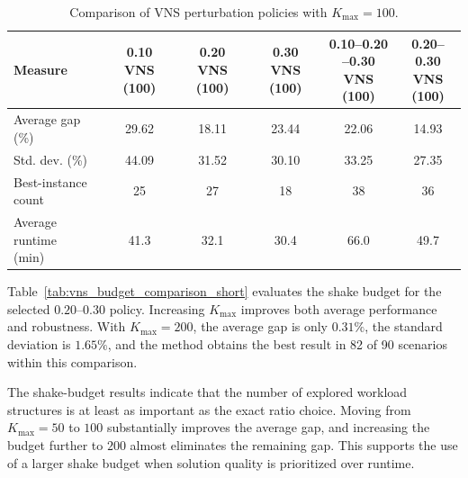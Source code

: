 \documentclass[11pt]{article}
\begin{document}
\begin{table}[H]
\centering
\caption{Comparison of VNS perturbation policies with \(K_{\max}=100\).}
\label{tab:vns_ratio_comparison_short}
\small
\begin{tabular}{lccccc}
\hline
\textbf{Measure}
&
\shortstack{\textbf{0.10}\\\textbf{VNS (100)}}
&
\shortstack{\textbf{0.20}\\\textbf{VNS (100)}}
&
\shortstack{\textbf{0.30}\\\textbf{VNS (100)}}
&
\shortstack{\textbf{0.10--0.20}\\\textbf{--0.30}\\\textbf{VNS (100)}}
&
\shortstack{\textbf{0.20--0.30}\\\textbf{VNS}\\\textbf{(100)}} \\
\hline
Average gap (\%) & 29.62 & 18.11 & 23.44 & 22.06 & 14.93 \\
Std. dev. (\%) & 44.09 & 31.52 & 30.10 & 33.25 & 27.35 \\
\shortstack[l]{Best-instance\\count} & 25 & 27 & 18 & 38 & 36 \\
\shortstack[l]{Average runtime\\(min)} & 41.3 & 32.1 & 30.4 & 66.0 & 49.7 \\
\hline
\end{tabular}
\end{table}

Table~\ref{tab:vns_budget_comparison_short} evaluates the shake budget for the selected \(0.20\)--\(0.30\) policy. Increasing \(K_{\max}\) improves both average performance and robustness. With \(K_{\max}=200\), the average gap is only \(0.31\%\), the standard deviation is \(1.65\%\), and the method obtains the best result in 82 of 90 scenarios within this comparison.

The shake-budget results indicate that the number of explored workload structures is at least as important as the exact ratio choice. Moving from \(K_{\max}=50\) to \(100\) substantially improves the average gap, and increasing the budget further to \(200\) almost eliminates the remaining gap. This supports the use of a larger shake budget when solution quality is prioritized over runtime.
\end{document}
